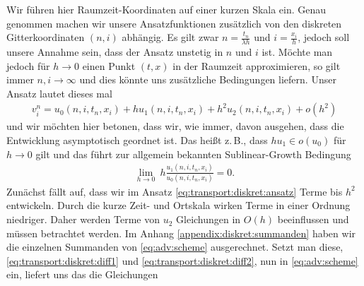 Wir führen hier Raumzeit-Koordinaten auf einer kurzen Skala ein.
Genau genommen machen wir unsere Ansatzfunktionen zusätzlich von den diskreten Gitterkoordinaten $(n,i)$ abhängig.
Es gilt zwar $n = \frac {t_n} {\lambda h}$ und $i = \frac {x_i}{h}$, jedoch soll unsere Annahme sein, dass der Ansatz unstetig in $n$ und $i$ ist.
Möchte man jedoch für $h \to 0$ einen Punkt $(t,x)$ in der Raumzeit approximieren, so gilt immer $n,i \to \infty$ und dies könnte uns zusätzliche Bedingungen liefern.
Unser Ansatz lautet dieses mal
\begin{align}\label{eq:transport:diskret:ansatz}
v^n_i = u_0(n, i, t_n, x_i) + h u_1(n, i, t_n, x_i) + h^2 u_2(n, i, t_n, x_i) + o(h^2)
\end{align}
und wir möchten hier betonen, dass wir, wie immer, davon ausgehen, dass die Entwicklung asymptotisch geordnet ist.
Das heißt z.\,B., dass $h u_1 \in o(u_0)$ für $h \to 0$ gilt und das führt zur allgemein bekannten Sublinear-Growth Bedingung
\begin{align}\label{eq:transport:diskret:sublineargrowth}
\lim_{h \to 0} \: h \frac{u_1(n, i, t_n, x_i)}{u_0(n, i, t_n, x_i)} = 0.
\end{align}
Zunächst fällt auf, dass wir im Ansatz \eqref{eq:transport:diskret:ansatz} Terme bis $h^2$ entwickeln.
Durch die kurze Zeit- und Ortskala wirken Terme in einer Ordnung niedriger.
Daher werden Terme von $u_2$ Gleichungen in $O(h)$ beeinflussen und müssen betrachtet werden.
Im Anhang \ref{appendix:diskret:summanden} haben wir die einzelnen Summanden von \eqref{eq:adv:scheme} ausgerechnet.
Setzt man diese, \eqref{eq:transport:diskret:diff1} und \eqref{eq:transport:diskret:diff2}, nun in \eqref{eq:adv:scheme} ein, liefert uns das die Gleichungen

